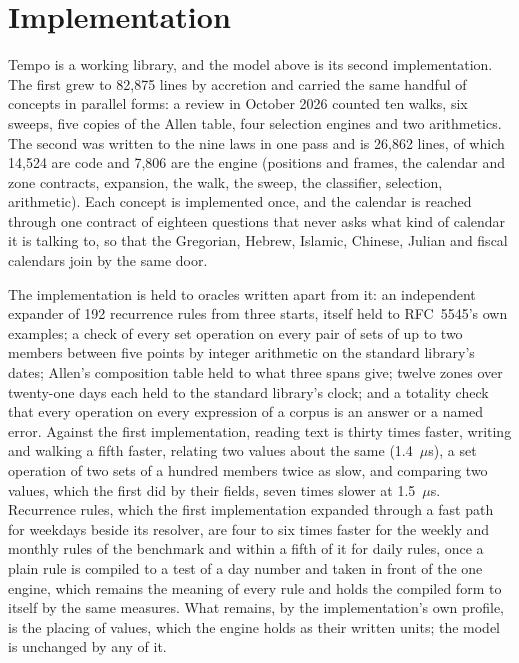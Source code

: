 \section{Implementation}
\label{sec:implementation}

Tempo is a working library, and the model above is its second
implementation. The first grew to 82,875 lines by accretion and carried
the same handful of concepts in parallel forms: a review in October
2026 counted ten walks, six sweeps, five copies of the Allen table,
four selection engines and two arithmetics. The second was written to
the nine laws in one pass and is 26,862 lines, of which 14,524 are
code and 7,806 are the engine (positions and frames, the calendar and
zone contracts, expansion, the walk, the sweep, the classifier,
selection, arithmetic). Each concept is implemented once, and the
calendar is reached through one contract of eighteen questions that
never asks what kind of calendar it is talking to, so that the
Gregorian, Hebrew, Islamic, Chinese, Julian and fiscal calendars join
by the same door.

The implementation is held to oracles written apart from it: an
independent expander of 192 recurrence rules from three starts, itself
held to RFC~5545's own examples; a check of every set operation on
every pair of sets of up to two members between five points by integer
arithmetic on the standard library's dates; Allen's composition table
held to what three spans give; twelve zones over twenty-one days each
held to the standard library's clock; and a totality check that every
operation on every expression of a corpus is an answer or a named
error. Against the first implementation, reading text is thirty times
faster, writing and walking a fifth faster, relating two values about
the same (1.4~$\mu$s), a set operation of two sets of a hundred
members twice as slow, and comparing two values, which the first did by
their fields, seven times slower at 1.5~$\mu$s. Recurrence rules,
which the first implementation expanded through a fast path for weekdays
beside its resolver, are four to six times faster for the weekly and
monthly rules of the benchmark and within a fifth of it for daily rules,
once a plain rule is compiled to a test of a day number and taken in
front of the one engine, which remains the meaning of every rule and
holds the compiled form to itself by the same measures. What remains,
by the implementation's own profile, is the placing of values, which
the engine holds as their written units; the model is unchanged by any
of it.

